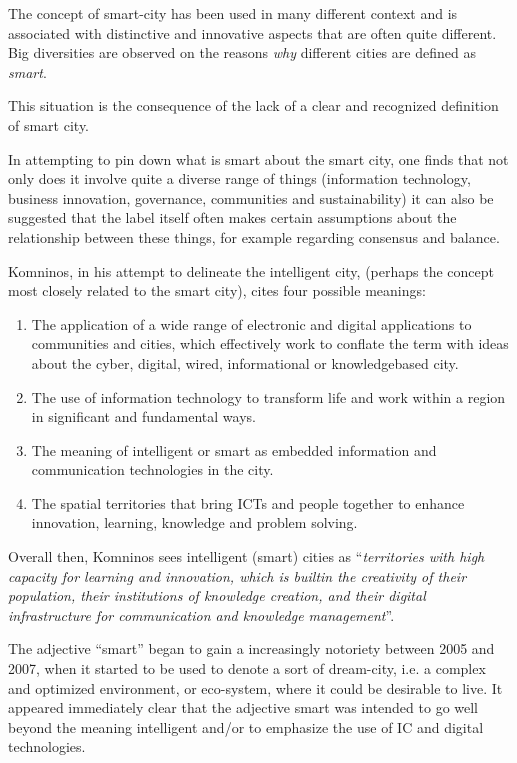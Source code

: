 The concept of smart-city has been used in many different context and is associated with distinctive and innovative aspects that are often quite different. Big diversities are observed on the reasons \textit{why} different cities are defined as \textit{smart}.

This situation is the consequence of the lack of a clear and recognized definition of smart city.

In attempting to pin down what is smart about the smart city, one finds that not only does it involve quite a diverse range of things (information technology, business innovation, governance, communities and sustainability) it can also be suggested that the label itself often makes certain assumptions about the relationship between these things, for example regarding consensus and balance\cite{hollands_will_2008}.

Komninos\cite{komninos_intelligent_2002}, in his attempt to delineate the intelligent city, (perhaps the concept most closely related to the smart city), cites four possible meanings:

\begin{enumerate}
\item The application of a wide range of electronic and digital applications to communities and cities, which effectively work to conflate the term with ideas about the cyber, digital, wired, informational or knowledge\textendash based city.
\item The use of information technology to transform life and work within a region in significant and fundamental ways.
\item The meaning of intelligent or smart as embedded information and communication technologies in the city.
\item The spatial territories that bring ICTs and people together to enhance innovation, learning, knowledge and problem solving.
\end{enumerate}

Overall then, Komninos\cite{komninos_intelligent_2002} sees intelligent (smart) cities as ``\textit{territories with high capacity for learning and innovation, which is built\textendash in the creativity of their population, their institutions of knowledge creation, and their digital infrastructure for communication and knowledge management}''.

The adjective ``smart'' began to gain a increasingly notoriety between 2005 and 2007, when it started to be used to denote a sort of dream-city, i.e. a complex and optimized environment, or eco-system, where it could be desirable to live. It appeared immediately clear that the adjective smart was intended to go well beyond the meaning intelligent and/or to emphasize the use of IC and digital technologies\cite{giovannella_smart_2014-1}.

